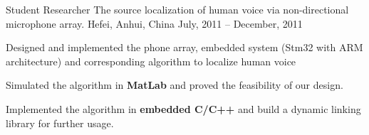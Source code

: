 \begin{cventries}
  \cventry
    {Student Researcher}
    {The source localization of human voice via non-directional microphone array.}
    {Hefei, Anhui, China}
    {July, 2011 -- December, 2011}
    {
      \begin{cvitems}
        \item {Designed and implemented the phone array, embedded system (Stm32 with ARM architecture) and corresponding algorithm to localize human voice}
        \item {Simulated the algorithm in \textbf{MatLab} and proved the feasibility of our design.}
        \item {Implemented the algorithm in \textbf{embedded C/C++} and build a dynamic linking library for further usage. }
      \end{cvitems}
    }

\end{cventries}
